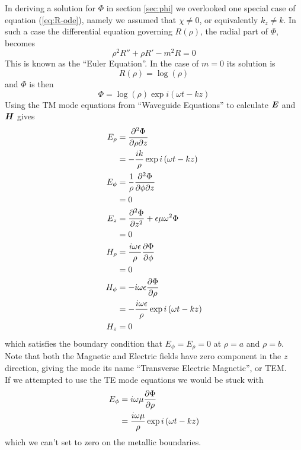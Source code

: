 \documentclass[twoside, a4paper]{article}
\begin{document}
In deriving a solution for $\Phi$ in section \ref{sec:phi} we overlooked one special case of equation (\ref{eq:R-ode}), namely we assumed that $\chi \neq 0$, or equivalently $k_z \neq k$. In such a case the differential equation governing $R(\rho)$, the radial part of $\Phi$, becomes
\begin{equation}
\label{eq:TEM-R}
\rho^2 R'' + \rho R' -m^2 R = 0
\end{equation}
This is known as the ``Euler Equation''. In the case of $m = 0$ its solution is
\begin{equation*}
R \left( \rho \right) = \log \left( \rho \right)
\end{equation*}
and $\Phi$ is then
\begin{equation}
\label{eq:TEM-Phi-m=0}
\Phi = \log \left( \rho \right) \exp i \left( \omega t - kz \right)
\end{equation}
Using the TM mode equations from ``Waveguide Equations'' to calculate $\mbox{\boldmath$ E $}$ and $\mbox{\boldmath$ H $}$ gives
\begin{align*}
E_\rho 	& = \frac{\partial^2 \Phi}{\partial \rho \partial z} \\
		& = - \frac{i k}{\rho} \exp i \left( \omega t - k z \right) \\
E_\phi	& = \frac{1}{\rho} \frac{\partial^2 \Phi}{\partial \phi \partial z} \\
		& = 0 \\
E_z		& = \frac{\partial^2 \Phi}{\partial z^2} + \epsilon \mu \omega^2 \Phi \\
		& = 0 \\
H_\rho	& = \frac{i \omega \epsilon}{\rho} \frac{\partial \Phi}{\partial \phi} \\
		& = 0 \\
H_\phi	& = - i \omega \epsilon \frac{\partial \Phi}{\partial \rho} \\
		& = - \frac{ i \omega \epsilon}{\rho} \exp i \left( \omega t - k z \right) \\
H_z		& = 0
\end{align*}
which satisfies the boundary condition that $E_\phi = E_\rho = 0$ at $\rho = a$ and $\rho = b$.
Note that both the Magnetic and Electric fields have zero component in the $z$ direction, giving the mode its name ``Transverse Electric Magnetic'', or TEM. \\
If we attempted to use the TE mode equations we would be stuck with
\begin{align*}
E_\phi & = i \omega \mu \frac{\partial \Phi}{\partial \rho} \\
& = \frac{i \omega \mu}{\rho} \exp i \left( \omega t - k z\right)
\end{align*}
which we can't set to zero on the metallic boundaries.
\end{document}
